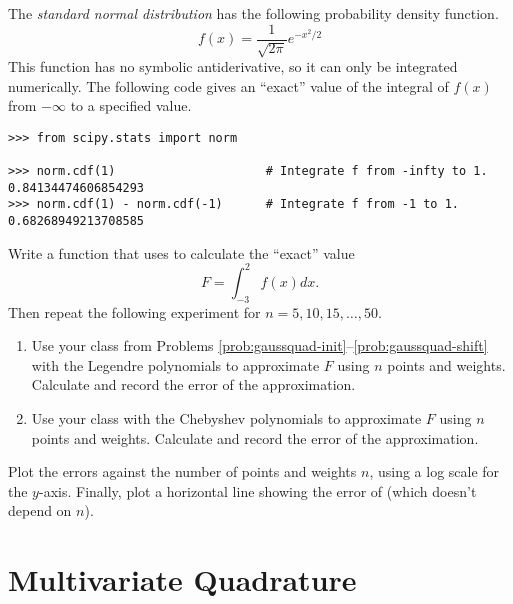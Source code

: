 \begin{problem} %
The \emph{standard normal distribution} has the following probability density function.
\[f(x) = \frac{1}{\sqrt{2 \pi}} e^{-x^2/2}\]
This function has no symbolic antiderivative, so it can only be integrated numerically.
The following code gives an ``exact'' value of the integral of $f(x)$ from $-\infty$ to a specified value.

\begin{lstlisting}
>>> from scipy.stats import norm

>>> norm.cdf(1)                     # Integrate f from -infty to 1.
0.84134474606854293
>>> norm.cdf(1) - norm.cdf(-1)      # Integrate f from -1 to 1.
0.68268949213708585
\end{lstlisting}

Write a function that uses  to calculate the ``exact'' value
\[
F = \int_{-3}^2 f(x)dx.
\]
Then repeat the following experiment for $n=5,10,15,\ldots,50$.
\begin{enumerate}
\item Use your class from Problems \ref{prob:gaussquad-init}--\ref{prob:gaussquad-shift} with the Legendre polynomials to approximate $F$ using $n$ points and weights.
Calculate and record the error of the approximation.
\item Use your class with the Chebyshev polynomials to approximate $F$ using $n$ points and weights.
Calculate and record the error of the approximation.
\end{enumerate}
Plot the errors against the number of points and weights $n$, using a log scale for the $y$-axis.
Finally, plot a horizontal line showing the error of  (which doesn't depend on $n$).
\end{problem}


\section*{Multivariate Quadrature} %

